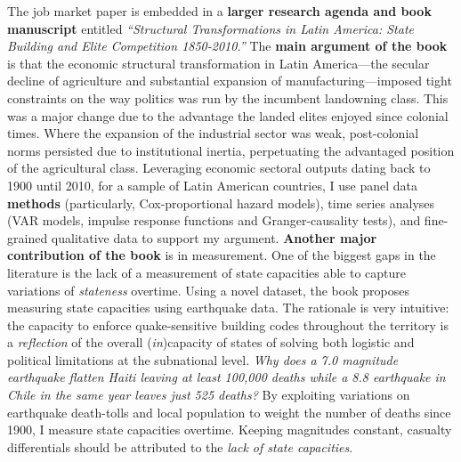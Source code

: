 \documentclass[10pt,stdletter,dateno,sigleft]{newlfm} %
\begin{document}
\begin{newlfm}
The job market paper is embedded in a {\bf larger research agenda and book manuscript} entitled \emph{``Structural Transformations in Latin America: State Building and Elite Competition 1850-2010.''} The {\bf main argument of the book} is that the economic structural transformation in Latin America---the secular decline of agriculture and substantial expansion of manufacturing---imposed tight constraints on the way politics was run by the incumbent landowning class. This was a major change due to the advantage the landed elites enjoyed since colonial times. Where the expansion of the industrial sector was weak, post-colonial norms persisted due to institutional inertia, perpetuating the advantaged position of the agricultural class. Leveraging economic sectoral outputs dating back to 1900 until 2010, for a sample of Latin American countries, I use panel data {\bf methods} (particularly, Cox-proportional hazard models), time series analyses (VAR models, impulse response functions and Granger-causality tests), and fine-grained qualitative data to support my argument. {\bf Another major contribution of the book} is in measurement. One of the biggest gaps in the literature is the lack of a measurement of state capacities able to capture variations of \emph{stateness} overtime. Using a novel dataset, the book proposes measuring state capacities using earthquake data. The rationale is very intuitive: the capacity to enforce quake-sensitive building codes throughout the territory is a \emph{reflection} of the overall (\emph{in})capacity of states of solving both logistic and political limitations at the subnational level. \emph{Why does a 7.0 magnitude earthquake flatten Haiti leaving at least 100,000 deaths while a 8.8 earthquake in Chile in the same year leaves just 525 deaths?} By exploiting  variations on earthquake death-tolls and local population to weight the number of deaths since 1900, I measure state capacities overtime. Keeping magnitudes constant, casualty differentials should be attributed to the \emph{lack of state capacities}.



\end{newlfm}
\end{document}
